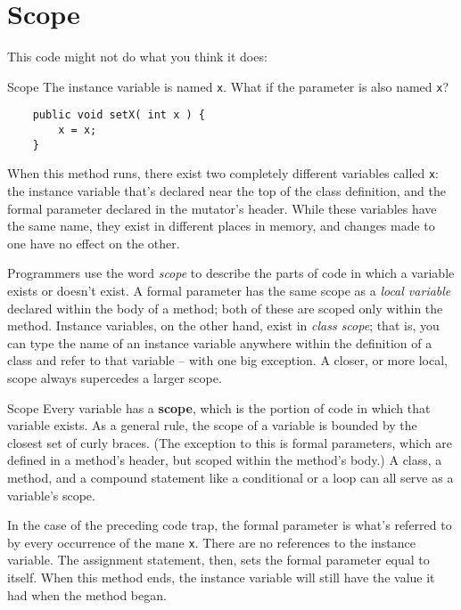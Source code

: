 \section{Scope}

This code might not do what you think it does:

\begin{trap}{Scope}
    The instance variable is named \texttt{x}.  What if the parameter is also named \texttt{x}?
    \begin{verbatim}
    public void setX( int x ) {
        x = x;
    }
    \end{verbatim}
\end{trap}

When this method runs, there exist two completely different variables called \texttt{x}: the instance variable that's declared near the top of the class definition, and the formal parameter declared in the mutator's header.  While these variables have the same name, they exist in different places in memory, and changes made to one have no effect on the other.

Programmers use the word \textit{scope} to describe the parts of code in which a variable exists or doesn't exist.  A formal parameter has the same scope as a \textit{local variable} declared within the body of a method; both of these are scoped only within the method.  Instance variables, on the other hand, exist in \textit{class scope}; that is, you can type the name of an instance variable anywhere within the definition of a class and refer to that variable -- with one big exception.  A closer, or more local, scope always supercedes a larger scope.

\begin{defn}{Scope}
    Every variable has a \textbf{scope}, which is the portion of code in which that variable exists.  As a general rule, the scope of a variable is bounded by the closest set of curly braces.  (The exception to this is formal parameters, which are defined in a method's header, but scoped within the method's body.)  A class, a method, and a compound statement like a conditional or a loop can all serve as a variable's scope.
\end{defn}

In the case of the preceding code trap, the formal parameter is what's referred to by every occurrence of the mane \texttt{x}.  There are no references to the instance variable.  The assignment statement, then, sets the formal parameter equal to itself.  When this method ends, the instance variable will still have the value it had when the method began.

